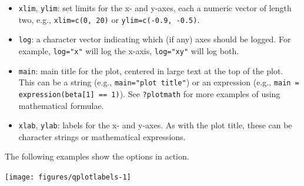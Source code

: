 \begin{itemize}
\itemsep1pt\parskip0pt
\item
  \texttt{xlim}, \texttt{ylim}: set limits for the x- and y-axes, each a
  numeric vector of length two, e.g., \texttt{xlim=c(0, 20)} or
  \texttt{ylim=c(-0.9, -0.5)}. 
\item
  \texttt{log}: a character vector indicating which (if any) axes should
  be logged. For example, \texttt{log="x"} will log the x-axis,
  \texttt{log="xy"} will log both.
\item
  \texttt{main}: main title for the plot, centered in large text at the
  top of the plot. This can be a string (e.g.,
  \texttt{main="plot title"}) or an expression (e.g.,
  \texttt{main = expression(beta{[}1{]} == 1)}). See \texttt{?plotmath}
  for more examples of using mathematical formulae. 
\item
  \texttt{xlab}, \texttt{ylab}: labels for the x- and y-axes. As with
  the plot title, these can be character strings or mathematical
  expressions. 
\end{itemize}

The following examples show the options in action.

\begin{Shaded}
\begin{Highlighting}[]
\NormalTok{>}\StringTok{ }\NormalTok{(}
\NormalTok{+}\StringTok{   } 
\NormalTok{+}\StringTok{   } \NormalTok{, } \NormalTok{,}
\NormalTok{+}\StringTok{   } 
\NormalTok{+}\StringTok{ }\NormalTok{)}
\end{Highlighting}
\end{Shaded}

\begin{flushleft}\texttt{[image: figures/qplotlabels-1]} \end{flushleft}

\begin{Shaded}
\begin{Highlighting}[]
\NormalTok{>}\StringTok{ }\NormalTok{(}
\NormalTok{+}\StringTok{    } 
\NormalTok{+}\StringTok{    } \NormalTok{(}
\NormalTok{+}\StringTok{    } \NormalTok{,  }
\NormalTok{+}\StringTok{    } \NormalTok{, }
\NormalTok{+}\StringTok{    } \NormalTok{,}\NormalTok{)}
\NormalTok{+}\StringTok{ }\NormalTok{)}
\end{Highlighting}
\end{Shaded}

